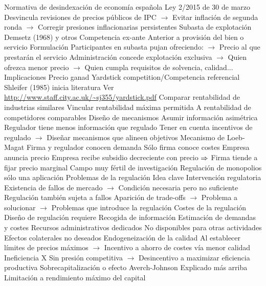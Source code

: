 \documentclass{nuevotema}
\begin{document}
\begin{esquemal}
				\4 Normativa de desindexación de economía española
				\4[] Ley 2/2015 de 30 de marzo
				\4[] Desvincula revisiones de precios públicos de IPC
				\4[] $\to$ Evitar inflación de segunda ronda
				\4[] $\to$ Corregir presiones inflacionarias persistentes
			\3 Subasta de explotación
				\4 Demsetz (1968) y otros
				\4 Competencia ex-ante
				\4[] Anterior a provisión del bien o servicio
				\4 Formulación
				\4[] Participantes en subasta pujan ofreciendo:
				\4[] $\to$ Precio al que prestarán el servicio
				\4[] Administración concede explotación exclusiva
				\4[] $\to$ Quien ofrezca menor precio
				\4[] $\to$ Quien cumpla requisitos de solvencia, calidad...
				\4 Implicaciones
				\4[] Precio ganad
			\3 Yardstick competition/Competencia referencial
				\4 Shleifer (1985) inicia literatura
				\4 Ver \url{http://www.staff.city.ac.uk/~sj355/yardstick.pdf}
				\4 Comparar rentabilidad de industrias similares
				\4 Vincular rentabilidad máxima permitida
				\4[] A rentabilidad de competidores comparables
			\3 Diseño de mecanismos
				\4 Asumir información asimétrica
				\4[] Regulador tiene menos información que regulado
				\4 Tener en cuenta incentivos de regulado
				\4[] $\to$ Diseñar mecanismos que alineen objetivos
				\4 Mecanismo de Loeb-Magat
				\4[] Firma y regulador conocen demanda
				\4[] Sólo firma conoce costes
				\4[] Empresa anuncia precio
				\4[] Empresa recibe subsidio decreciente con precio
				\4[] $\Rightarrow$ Firma tiende a fijar precio marginal
				\4 Campo muy fértil de investigación
				\4[] Regulación de monopolios sólo una aplicación
		\2 Problemas de la regulación
			\3 Idea clave
				\4 Intervención regulatoria
				\4[] Existencia de fallos de mercado
				\4[] $\to$ Condición necesaria pero no suficiente
				\4 Regulación también sujeta a fallos
				\4[] Aparición de trade-offs
				\4[] $\to$ Problema a solucionar
				\4[] $\to$ Problemas que introduce la regulación
			\3 Costes de la regulación
				\4 Diseño de regulación requiere
				\4[] Recogida de información
				\4[] Estimación de demandas y costes
				\4 Recursos administrativos dedicados
				\4[] No disponibles para otras actividades
			\3 Efectos colaterales no deseados
				\4 Endogeneización de la calidad
				\4[] Al establecer límites de precios máximos
				\4[] $\to$ Incentivo a ahorro de costes vía menor calidad
				\4 Ineficiencia X
				\4[] Sin presión competitiva
				\4[] $\to$ Desincentivo a maximizar eficiencia productiva
				\4 Sobrecapitalización o efecto Averch-Johnson
				\4[] Explicado más arriba
				\4[] Limitación a rendimiento máximo del capital

\end{esquemal}
\end{document}
